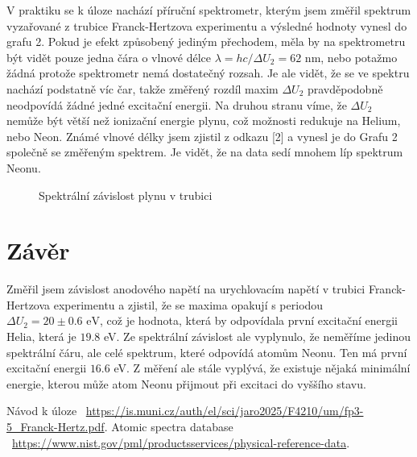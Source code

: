 \documentclass[a4paper,11pt]{article}
\begin{document}
V praktiku se k úloze nachází příruční spektrometr, kterým jsem změřil spektrum vyzařované z trubice Franck-Hertzova experimentu a výsledné hodnoty vynesl do grafu 2. Pokud je efekt způsobený jediným přechodem, měla by na spektrometru být vidět pouze jedna čára o vlnové délce $ \lambda = hc / \Delta U_2 = 62 $ nm, nebo potažmo žádná protože spektrometr nemá dostatečný rozsah. Je ale vidět, že se ve spektru nachází podstatně víc čar, takže změřený rozdíl maxim $ \Delta U_2 $ pravděpodobně neodpovídá žádné jedné excitační energii. Na druhou stranu víme, že $ \Delta U_2 $ nemůže být větší než ionizační energie plynu, což možnosti redukuje na Helium, nebo Neon. Známé vlnové délky jsem zjistil z odkazu [2] a vynesl je do Grafu 2 společně se změřeným spektrem. Je vidět, že na data sedí mnohem líp spektrum Neonu.

\begin{figure}[htpb]
    \centering
    
    \captionsetup{type=graph}
    \caption{Spektrální závislost plynu v trubici}
\end{figure}

\section{Závěr}

Změřil jsem závislost anodového napětí na urychlovacím napětí v trubici Franck-Hertzova experimentu a zjistil, že se maxima opakují s periodou $ \Delta U_2 = 20 \pm 0.6 \text{ eV} $, což je hodnota, která by odpovídala první excitační energii Helia, která je $ 19.8 $ eV. Ze spektrální závislost ale vyplynulo, že neměříme jedinou spektrální čáru, ale celé spektrum, které odpovídá atomům Neonu. Ten má první excitační energii $ 16.6 $ eV. Z měření ale stále vyplývá, že existuje nějaká minimální energie, kterou může atom Neonu přijmout při excitaci do vyššího stavu.  

\begin{thebibliography}{0}
 Návod k úloze ~\url{https://is.muni.cz/auth/el/sci/jaro2025/F4210/um/fp3-5_Franck-Hertz.pdf}.   
 Atomic spectra database  \\ ~\url{https://www.nist.gov/pml/productsservices/physical-reference-data}.   
\end{thebibliography}
\end{document}
